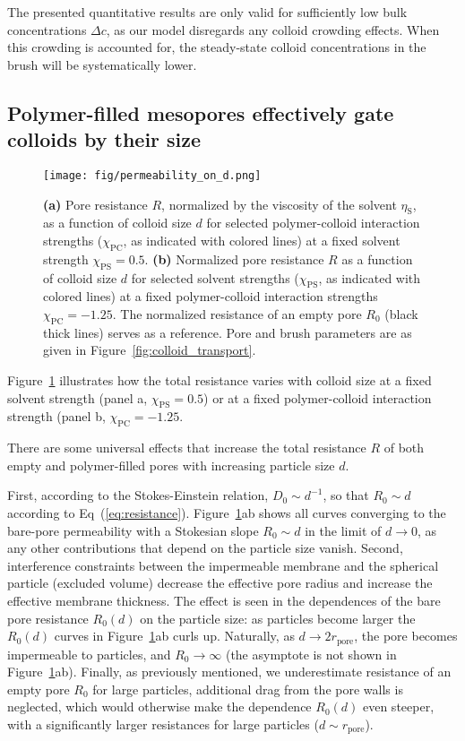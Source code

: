 \documentclass[12pt, a4paper]{article}
\begin{document}
The presented quantitative results are only valid for sufficiently low bulk concentrations $\Delta c$, as our model disregards any colloid crowding effects.
When this crowding is accounted for, the steady-state colloid concentrations in the brush will be systematically lower.


\subsection{Polymer-filled mesopores effectively gate colloids by their size}

\begin{figure}
    \centering
    \texttt{[image: fig/permeability\_on\_d.png]}
    \caption{
    \textbf{(a)} 
    Pore resistance $R$, normalized by the viscosity of the solvent $\eta_\text{S}$, as a function of colloid size $d$ for selected polymer-colloid interaction strengths ($\chi_{\text{PC}}$, as indicated with colored lines) at a fixed solvent strength $\chi_{\text{PS}} =0.5$.
    \textbf{(b)}
    Normalized pore resistance $R$ as a function of colloid size $d$ for selected solvent strengths ($\chi_{\text{PS}}$, as indicated with colored lines) at a fixed polymer-colloid interaction strengths $\chi_{\text{PC}} = -1.25$. 
    The normalized resistance of an empty pore $R_{0}$ (black thick lines) serves as a reference.
    Pore and brush parameters are as given in Figure~\ref{fig:colloid_transport}. 
    }
    \label{fig:R_vs_d}
\end{figure}

Figure~\ref{fig:R_vs_d} illustrates how the total resistance varies with colloid size at a fixed solvent strength (panel a, $\chi_{\text{PS}} = 0.5$) or at a fixed polymer-colloid interaction strength (panel b, $\chi_{\text{PC}} = -1.25$.

There are some universal effects that increase the total resistance $R$ of both empty and polymer-filled pores with increasing particle size $d$.

First, according to the Stokes-Einstein relation, $D_0 \sim d^{-1}$, so that $R_0 \sim d$ according to Eq~(\ref{eq:resistance}). 
Figure~\ref{fig:R_vs_d}ab shows all curves converging to the bare-pore permeability with a Stokesian slope $R_0 \sim d$ in the limit of $d \to 0$, as any other contributions that depend on the particle size vanish.
Second, interference constraints between the impermeable membrane and the spherical particle (excluded volume) decrease the effective pore radius and increase the effective membrane thickness.
The effect is seen in the dependences of the bare pore resistance $R_0(d)$ on the particle size:  
as particles become larger the $R_0(d)$ curves in Figure~\ref{fig:R_vs_d}ab curls up.
Naturally, as $d \to 2r_{\text{pore}}$, the pore becomes impermeable to particles, and $R_0 \to \infty$ (the asymptote is not shown in Figure~\ref{fig:R_vs_d}ab).
Finally, as previously mentioned, we underestimate resistance of an empty pore $R_0$ for large particles,
additional drag from the pore walls is neglected, which would otherwise make the dependence $R_0(d)$ even steeper, 
with a significantly larger resistances for large particles ($d \sim r_{\text{pore}}$).
\end{document}
